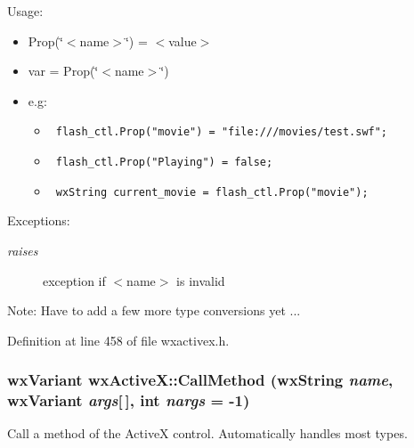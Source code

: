 \begin{Desc}
\item[Usage:]\begin{itemize}
\item Prop(\char`\"{}$<$name$>$\char`\"{}) = $<$value$>$\item var = Prop(\char`\"{}$<$name$>$\char`\"{})\item e.g:\begin{itemize}
\item 

\footnotesize\begin{verbatim} flash_ctl.Prop("movie") = "file:///movies/test.swf";
\end{verbatim}\normalsize
\item 

\footnotesize\begin{verbatim} flash_ctl.Prop("Playing") = false;
\end{verbatim}\normalsize
\item 

\footnotesize\begin{verbatim} wxString current_movie = flash_ctl.Prop("movie");
\end{verbatim}\normalsize
\end{itemize}
\end{itemize}
\end{Desc}
\begin{Desc}
\item[Exceptions:]
\begin{description}
\item[{\em raises}]exception if $<$name$>$ is invalid \end{description}
\end{Desc}
\begin{Desc}
\item[Note:]Have to add a few more type conversions yet ... \end{Desc}


Definition at line 458 of file wxactivex.h.
\subsubsection{\setlength{\rightskip}{0pt plus 5cm}wx\-Variant wx\-Active\-X::Call\-Method (wx\-String {\em name}, wx\-Variant {\em args}[$\,$], int {\em nargs} = -1)}\label{classwxActiveX_a26}


Call a method of the Active\-X control. Automatically handles most types.

